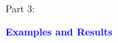 
\begin{frame}

Part 3:
\vspace{0.2cm}

{\LARGE \textbf{\textcolor{blue}{Examples and Results}}}

\end{frame}